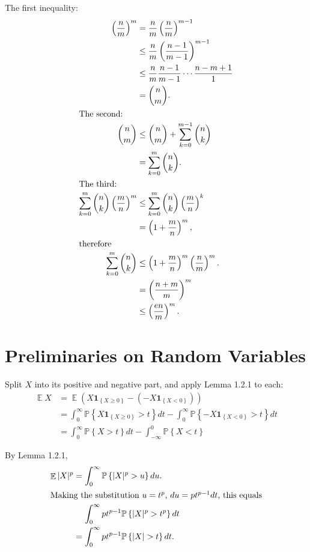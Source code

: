 \documentclass{report}
\theoremstyle{definition}
\newenvironment{exercise}[1]{
  \renewcommand\theexerciseimpl{#1}
  \exerciseimpl
}{\endexerciseimpl}
\DeclareMathOperator{\E}{\mathbb{E}}
\renewcommand{\P}[1]{\mathbb{P}\left\{#1\right\}}
\newcommand{\ind}[1]{\mathbf{1}_{\left\{#1\right\}}}
\begin{document}
\begin{exercise}{0.0.5}
  The first inequality:
  \begin{align*}
    \left(\frac{n}{m}\right)^m & = \frac{n}{m} \left(\frac{n}{m}\right)^{m-1} \\
    & \le \frac{n}{m} \left(\frac{n-1}{m-1}\right)^{m-1} \\
    & \le \frac{n}{m} \frac{n-1}{m-1} \cdots \frac{n-m+1}{1} \\
    & = \binom{n}{m}. \\
    \intertext{The second:}
    \binom{n}{m} & \le \binom{n}{m} + \sum_{k=0}^{m-1} \binom{n}{k} \\
    & = \sum_{k=0}^m \binom{n}{k}. \\
    \intertext{The third:}
    \sum_{k=0}^m \binom{n}{k} \left(\frac{m}{n}\right)^m & \le \sum_{k=0}^m \binom{n}{k} \left(\frac{m}{n}\right)^k \\
    & = \left(1 + \frac{m}{n}\right)^m, \\
    \intertext{therefore}
    \sum_{k=0}^m \binom{n}{k} & \le \left(1 + \frac{m}{n}\right)^m \left(\frac{n}{m}\right)^m. \\
    & = \left(\frac{n + m}{m}\right)^m \\
    & \le \left(\frac{e n}{m}\right)^m.
  \end{align*}
\end{exercise}

\begin{exercise}{0.0.6}
\end{exercise}


\chapter{Preliminaries on Random Variables}

\begin{exercise}{1.2.2}
  Split $X$ into its positive and negative part, and apply Lemma 1.2.1 to each:
  \begin{align*}
    \E X & = \E (X \ind{X \ge 0} - (-X \ind{X < 0})) \\
    & = \int_0^\infty \P{X \ind{X \ge 0} > t} dt - \int_{0}^{\infty} \P{-X \ind{X < 0} > t} dt \\
    & = \int_0^\infty \P{X > t} dt - \int_{-\infty}^0 \P{X < t}
  \end{align*}
\end{exercise}

\begin{exercise}{1.2.3}
  By Lemma 1.2.1,
  \begin{align*}
    \E |X|^p & = \int_0^\infty \P{|X|^p > u} du. \\
    \intertext{Making the substitution $u = t^p$, $du = p t^{p-1} dt$, this equals}
    & \mathrel{\phantom{=}} \int_0^\infty p t^{p-1} \P{|X|^p > t^p} dt \\
    & = \int_0^\infty p t^{p-1} \P{|X| > t} dt.
  \end{align*}
\end{exercise}
\end{document}
